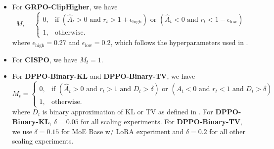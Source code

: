 \begin{itemize}  
    \item For \textbf{GRPO-ClipHigher}, we have 
    \begin{equation*}  
    M_t =  
        \begin{cases}  
            0, & \text{if } (\hat{A}_t > 0 \text{ and } r_t > 1 + \epsilon_\text{high}) \text{ or } (\hat{A}_t < 0 \text{ and } r_t < 1 - \epsilon_\text{low}) \\  
            1, & \text{otherwise}.  
        \end{cases}  
    \end{equation*} 
    where $\epsilon_\text{high}=0.27$ and $\epsilon_\text{low}=0.2$, which follows the hyperparameters used in \citet{zheng2025stabilizing}.

    \item For \textbf{CISPO}, we have $M_t = 1$.

    \item For \textbf{DPPO-Binary-KL} and \textbf{DPPO-Binary-TV}, we have 
    \begin{equation*}  
    M_t =  
        \begin{cases}  
            0, & \text{if } (\hat{A}_t > 0 \text{ and } r_t > 1 \text{ and } D_t > \delta) \text{ or } (\hat{A}_t < 0 \text{ and } r_t < 1 \text{ and } D_t > \delta) \\  
            1, & \text{otherwise}.  
        \end{cases}  
    \end{equation*} 
    where $D_t$ is binary approximation of KL or TV as defined in . For \textbf{DPPO-Binary-KL}, $\delta=0.05$ for all scaling experiments. For \textbf{DPPO-Binary-TV}, we use $\delta=0.15$ for MoE Base w/ LoRA experiment and $\delta=0.2$ for all other scaling experiments.
\end{itemize}


